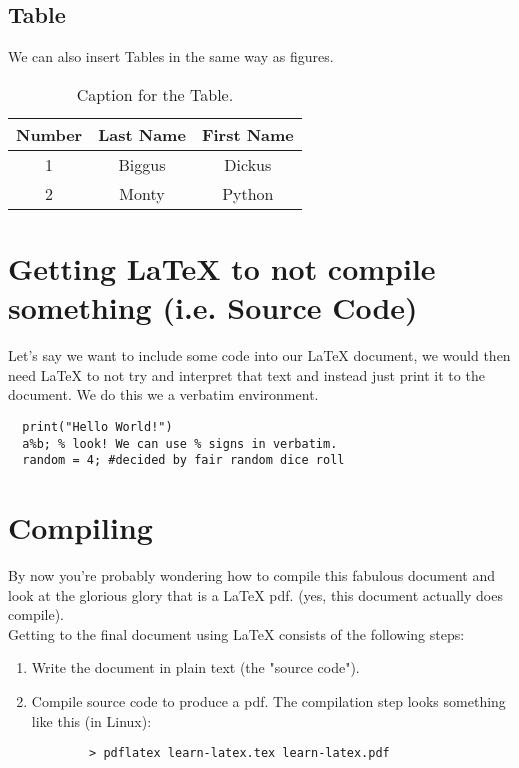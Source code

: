 \documentclass[12pt]{article}
\begin{document}
\subsection{Table}
We can also insert Tables in the same way as figures.

\begin{table}[H]
  \caption{Caption for the Table.}
  \begin{tabular}{c|cc} 
    Number &  Last Name & First Name \\ %
    \hline %
    1 & Biggus & Dickus \\
    2 & Monty & Python
  \end{tabular}
\end{table}


\section{Getting LaTeX to not compile something (i.e. Source Code)}
Let's say we want to include some code into our LaTeX document,
we would then need LaTeX to not try and interpret that text and
instead just print it to the document. We do this we a verbatim 
environment. 

\begin{verbatim} 
  print("Hello World!")
  a%b; % look! We can use % signs in verbatim. 
  random = 4; #decided by fair random dice roll
\end{verbatim}

\section{Compiling} 

By now you're probably wondering how to compile this fabulous document 
and look at the glorious glory that is a LaTeX pdf.
(yes, this document actually does compile). \\
Getting to the final document using LaTeX consists of the following steps:
  \begin{enumerate}
    \item Write the document in plain text (the "source code").
    \item Compile source code to produce a pdf. 
     The compilation step looks something like this (in Linux): \\
     \begin{verbatim} 
        > pdflatex learn-latex.tex learn-latex.pdf 
     \end{verbatim}
  \end{enumerate}
\end{document}
